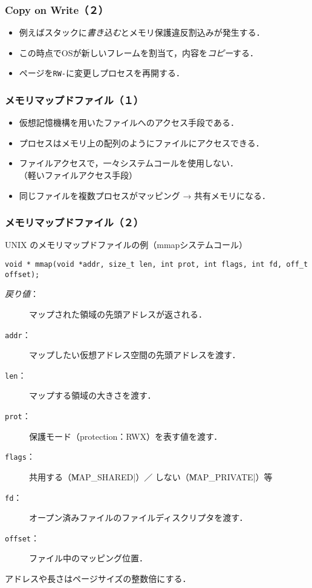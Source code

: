 \documentclass[unicode]{beamer}                   %
\begin{document}
\begin{frame}
  \frametitle{Copy on Write（２）}
  \begin{itemize}
  \item 例えばスタックに\emph{書き込む}とメモリ保護違反割込みが発生する．
  \item この時点でOSが新しいフレームを割当て，内容を\emph{コピー}する．
  \item ページを\texttt{RW-}に変更しプロセスを再開する．
  \end{itemize}
\end{frame}

\begin{frame}
  \frametitle{メモリマップドファイル（１）}
  \begin{itemize}
  \item 仮想記憶機構を用いたファイルへのアクセス手段である．
  \item プロセスはメモリ上の配列のようにファイルにアクセスできる．
  \item ファイルアクセスで，一々システムコールを使用しない．\\
    （軽いファイルアクセス手段）
  \item 同じファイルを複数プロセスがマッピング → 共有メモリになる．
  \end{itemize}
\end{frame}

\begin{frame}[fragile]
  \frametitle{メモリマップドファイル（２）}
  UNIX のメモリマップドファイルの例（mmapシステムコール）

\begin{lstlisting}[numbers=none]
void * mmap(void *addr, size_t len, int prot, int flags, int fd, off_t offset);
\end{lstlisting}

  \begin{description}
  \item[\emph{戻り値}：] マップされた領域の先頭アドレスが返される．
  \item[\texttt{addr}：] マップしたい仮想アドレス空間の先頭アドレスを渡す．
  \item[\texttt{len}：] マップする領域の大きさを渡す．
  \item[\texttt{prot}：] 保護モード（protection：RWX）を表す値を渡す．
  \item[\texttt{flags}：]共用する（\|MAP_SHARED|）／
    しない（\|MAP_PRIVATE|）等
  \item[\texttt{fd}：] オープン済みファイルのファイルディスクリプタを渡す．
  \item[\texttt{offset}：] ファイル中のマッピング位置．
  \end{description}

  アドレスや長さはページサイズの整数倍にする．
\end{frame}
\end{document}
